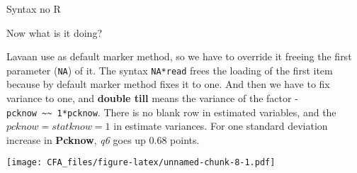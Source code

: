 \documentclass[
]{article}
\newenvironment{Shaded}{\begin{snugshade}}{\end{snugshade}}
\newcommand{\AttributeTok}[1]{\textcolor[rgb]{0.77,0.63,0.00}{#1}}
\newcommand{\CommentTok}[1]{\textcolor[rgb]{0.56,0.35,0.01}{\textit{#1}}}
\newcommand{\ConstantTok}[1]{\textcolor[rgb]{0.00,0.00,0.00}{#1}}
\newcommand{\FunctionTok}[1]{\textcolor[rgb]{0.00,0.00,0.00}{#1}}
\newcommand{\NormalTok}[1]{#1}
\newcommand{\OtherTok}[1]{\textcolor[rgb]{0.56,0.35,0.01}{#1}}
\newcommand{\SpecialCharTok}[1]{\textcolor[rgb]{0.00,0.00,0.00}{#1}}
\newcommand{\StringTok}[1]{\textcolor[rgb]{0.31,0.60,0.02}{#1}}
\begin{document}
Syntax no R

\begin{Shaded}
\end{Shaded}

Now what is it doing?

Lavaan use as default marker method, so we have to override it freeing
the first parameter (\texttt{NA}) of it. The syntax \texttt{NA*read}
frees the loading of the first item because by default marker method
fixes it to one. And then we have to fix variance to one, and
\textbf{double till} means the variance of the factor -
\texttt{pcknow\ \textasciitilde{}\textasciitilde{}\ 1*pcknow}. There is
no blank row in estimated variables, and the \(pcknow = statknow = 1\)
in estimate variances. For one standard deviation increase in
\textbf{Pcknow}, \emph{q6} goes up 0.68 points.

\texttt{[image: CFA\_files/figure-latex/unnamed-chunk-8-1.pdf]}

\begin{Shaded}
\end{Shaded}
\end{document}
